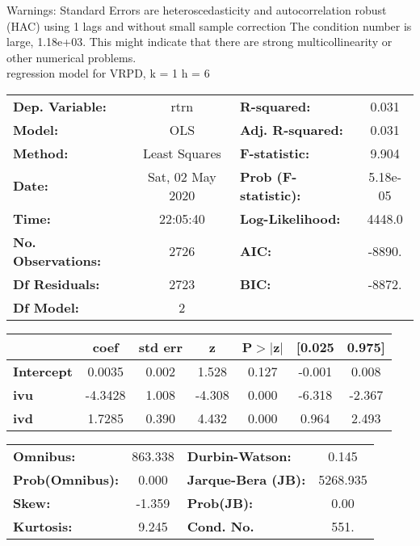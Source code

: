 Warnings: \newline
 [1] Standard Errors are heteroscedasticity and autocorrelation robust (HAC) using 1 lags and without small sample correction \newline
 [2] The condition number is large, 1.18e+03. This might indicate that there are \newline
 strong multicollinearity or other numerical problems.\\ 

regression model for VRPD, k = 1 h = 6\begin{center}
\begin{tabular}{lclc}
\toprule
\textbf{Dep. Variable:}    &       rtrn       & \textbf{  R-squared:         } &     0.031   \\
\textbf{Model:}            &       OLS        & \textbf{  Adj. R-squared:    } &     0.031   \\
\textbf{Method:}           &  Least Squares   & \textbf{  F-statistic:       } &     9.904   \\
\textbf{Date:}             & Sat, 02 May 2020 & \textbf{  Prob (F-statistic):} &  5.18e-05   \\
\textbf{Time:}             &     22:05:40     & \textbf{  Log-Likelihood:    } &    4448.0   \\
\textbf{No. Observations:} &        2726      & \textbf{  AIC:               } &    -8890.   \\
\textbf{Df Residuals:}     &        2723      & \textbf{  BIC:               } &    -8872.   \\
\textbf{Df Model:}         &           2      & \textbf{                     } &             \\
\bottomrule
\end{tabular}
\begin{tabular}{lcccccc}
                   & \textbf{coef} & \textbf{std err} & \textbf{z} & \textbf{P$> |$z$|$} & \textbf{[0.025} & \textbf{0.975]}  \\
\midrule
\textbf{Intercept} &       0.0035  &        0.002     &     1.528  &         0.127        &       -0.001    &        0.008     \\
\textbf{ivu}       &      -4.3428  &        1.008     &    -4.308  &         0.000        &       -6.318    &       -2.367     \\
\textbf{ivd}       &       1.7285  &        0.390     &     4.432  &         0.000        &        0.964    &        2.493     \\
\bottomrule
\end{tabular}
\begin{tabular}{lclc}
\textbf{Omnibus:}       & 863.338 & \textbf{  Durbin-Watson:     } &    0.145  \\
\textbf{Prob(Omnibus):} &   0.000 & \textbf{  Jarque-Bera (JB):  } & 5268.935  \\
\textbf{Skew:}          &  -1.359 & \textbf{  Prob(JB):          } &     0.00  \\
\textbf{Kurtosis:}      &   9.245 & \textbf{  Cond. No.          } &     551.  \\
\bottomrule
\end{tabular}
\end{center}

